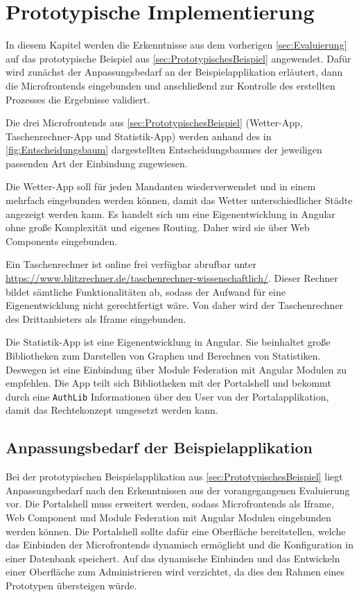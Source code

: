 \section{Prototypische Implementierung}\label{sec:Implementierung}

In diesem Kapitel werden die Erkenntnisse aus dem vorherigen \cref{sec:Evaluierung} auf das prototypische Beispiel aus \cref{sec:PrototypischesBeispiel} angewendet. Dafür wird zunächst der Anpassungsbedarf an der Beispielapplikation erläutert, dann die Microfrontends eingebunden und anschließend zur Kontrolle des erstellten Prozesses die Ergebnisse validiert.

Die drei Microfrontends aus \cref{sec:PrototypischesBeispiel} (Wetter-App, Taschenrechner-App und Statistik-App) werden anhand des in \cref{fig:Entscheidungsbaum} dargestellten Entscheidungsbaumes der jeweiligen passenden Art der Einbindung zugewiesen.

Die Wetter-App soll für jeden Mandanten wiederverwendet und in einem  mehrfach eingebunden werden können, damit das Wetter unterschiedlicher Städte angezeigt werden kann. Es handelt sich um eine Eigenentwicklung in Angular ohne große Komplexität und eigenes Routing. Daher wird sie über Web Components eingebunden.

Ein Taschenrechner ist online frei verfügbar abrufbar unter \url{https://www.blitzrechner.de/taschenrechner-wissenschaftlich/}. Dieser Rechner bildet sämtliche Funktionalitäten ab, sodass der Aufwand für eine Eigenentwicklung nicht gerechtfertigt wäre. Von daher wird der Taschenrechner des Drittanbieters als Iframe eingebunden.

Die Statistik-App ist eine Eigenentwicklung in Angular. Sie beinhaltet große Bibliotheken zum Darstellen von Graphen und Berechnen von Statistiken. Deswegen ist eine Einbindung über Module Federation mit Angular Modulen zu empfehlen. Die App teilt sich Bibliotheken mit der Portalshell und bekommt durch eine \texttt{AuthLib} Informationen über den User von der Portalapplikation, damit das Rechtekonzept umgesetzt werden kann.

\subsection{Anpassungsbedarf der Beispielapplikation}\label{sec:ImplementierungAnpassungsbedarf}

Bei der prototypischen Beispielapplikation aus \cref{sec:PrototypischesBeispiel} liegt Anpassungsbedarf nach den Erkenntnissen aus der vorangegangenen Evaluierung vor. Die Portalshell muss erweitert werden, sodass Microfrontends als Iframe, Web Component und Module Federation mit Angular Modulen eingebunden werden können. Die Portalshell sollte dafür eine Oberfläche bereitstellen, welche das Einbinden der Microfrontends dynamisch ermöglicht und die Konfiguration in einer Datenbank speichert. Auf das dynamische Einbinden und das Entwickeln einer Oberfläche zum Administrieren wird verzichtet, da dies den Rahmen eines Prototypen übersteigen würde. 

